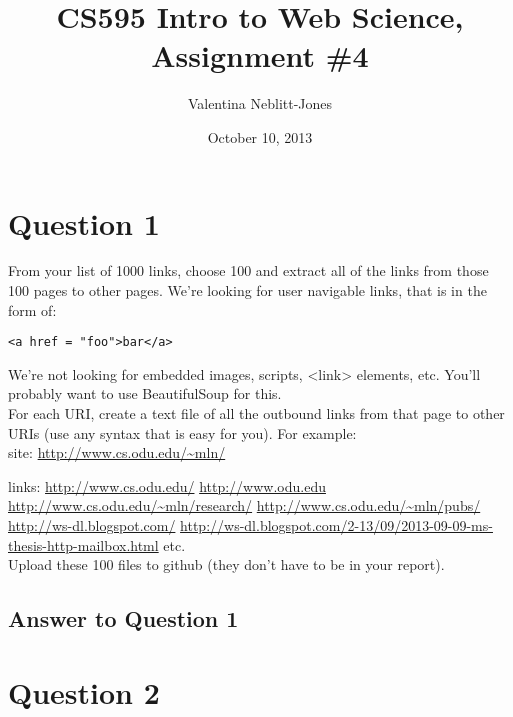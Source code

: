\documentclass{article}
\begin{document}
\title{CS595 Intro to Web Science, Assignment \#4}
\author{Valentina Neblitt-Jones}
\date{October 10, 2013}
\maketitle

\section*{Question 1}

From your list of 1000 links, choose 100 and extract all of the links from those 100 pages to other pages. We're looking for user navigable links, that is in the form of:  \\

\begin{verbatim}
<a href = "foo">bar</a>
\end{verbatim}

We're not looking for embedded images, scripts, <link> elements, etc. You'll probably want to use BeautifulSoup for this. \\

For each URI, create a text file of all the outbound links from that page to other URIs (use any syntax that is easy for you). For example: \\

site:
\url{http://www.cs.odu.edu/~mln/}

links:
\url{http://www.cs.odu.edu/}
\url{http://www.odu.edu}
\url{http://www.cs.odu.edu/~mln/research/}
\url{http://www.cs.odu.edu/~mln/pubs/}
\url{http://ws-dl.blogspot.com/}
\url{http://ws-dl.blogspot.com/2-13/09/2013-09-09-ms-thesis-http-mailbox.html}
etc. \\

Upload these 100 files to github (they don't have to be in your report).

\subsection*{Answer to Question 1}


\newpage

\section*{Question 2}
\end{document}
